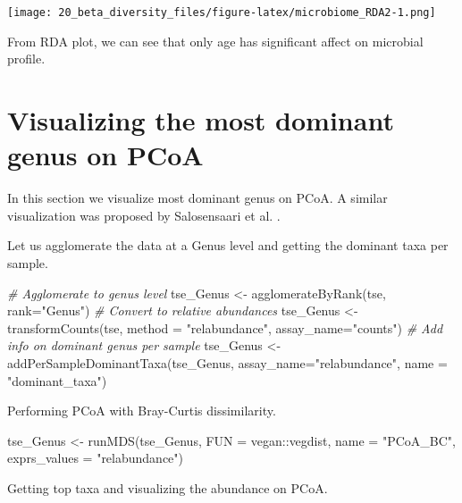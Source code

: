 \documentclass[
]{book}
\newenvironment{Shaded}{\begin{snugshade}}{\end{snugshade}}
\newcommand{\AttributeTok}[1]{\textcolor[rgb]{0.77,0.63,0.00}{#1}}
\newcommand{\CommentTok}[1]{\textcolor[rgb]{0.56,0.35,0.01}{\textit{#1}}}
\newcommand{\FunctionTok}[1]{\textcolor[rgb]{0.00,0.00,0.00}{#1}}
\newcommand{\NormalTok}[1]{#1}
\newcommand{\OtherTok}[1]{\textcolor[rgb]{0.56,0.35,0.01}{#1}}
\newcommand{\SpecialCharTok}[1]{\textcolor[rgb]{0.00,0.00,0.00}{#1}}
\newcommand{\StringTok}[1]{\textcolor[rgb]{0.31,0.60,0.02}{#1}}
\begin{document}
\texttt{[image: 20\_beta\_diversity\_files/figure-latex/microbiome\_RDA2-1.png]}

From RDA plot, we can see that only age has significant affect on microbial profile.

\hypertarget{pcoa-genus}{%
\section{Visualizing the most dominant genus on PCoA}\label{pcoa-genus}}

In this section we visualize most dominant genus on PCoA. A similar visualization was proposed by Salosensaari et al. \citeyearpar{Salosensaari2021}.

Let us agglomerate the data at a Genus level and getting the dominant taxa per sample.

\begin{Shaded}
\begin{Highlighting}[]
\CommentTok{\# Agglomerate to genus level}
\NormalTok{tse\_Genus }\OtherTok{\textless{}{-}} \FunctionTok{agglomerateByRank}\NormalTok{(tse, }\AttributeTok{rank=}\StringTok{"Genus"}\NormalTok{)}
\CommentTok{\# Convert to relative abundances}
\NormalTok{tse\_Genus }\OtherTok{\textless{}{-}} \FunctionTok{transformCounts}\NormalTok{(tse, }\AttributeTok{method =} \StringTok{"relabundance"}\NormalTok{, }\AttributeTok{assay\_name=}\StringTok{"counts"}\NormalTok{)}
\CommentTok{\# Add info on dominant genus per sample}
\NormalTok{tse\_Genus }\OtherTok{\textless{}{-}} \FunctionTok{addPerSampleDominantTaxa}\NormalTok{(tse\_Genus, }\AttributeTok{assay\_name=}\StringTok{"relabundance"}\NormalTok{, }\AttributeTok{name =} \StringTok{"dominant\_taxa"}\NormalTok{)}
\end{Highlighting}
\end{Shaded}

Performing PCoA with Bray-Curtis dissimilarity.

\begin{Shaded}
\begin{Highlighting}[]
\NormalTok{tse\_Genus }\OtherTok{\textless{}{-}} \FunctionTok{runMDS}\NormalTok{(tse\_Genus, }\AttributeTok{FUN =}\NormalTok{ vegan}\SpecialCharTok{::}\NormalTok{vegdist,}
              \AttributeTok{name =} \StringTok{"PCoA\_BC"}\NormalTok{, }\AttributeTok{exprs\_values =} \StringTok{"relabundance"}\NormalTok{)}
\end{Highlighting}
\end{Shaded}

Getting top taxa and visualizing the abundance on PCoA.
\end{document}
